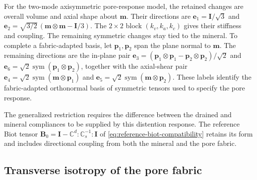 For the two-mode axisymmetric pore-response model, the retained changes are
overall volume and axial shape about \(\mathbf m\). Their directions are
\(\mathbf e_1=\mathbf I/\sqrt3\) and
\(\mathbf e_2=\sqrt{3/2}\,(\mathbf m\otimes\mathbf m-\mathbf I/3)\).
The \(2\times2\) block \((k_v,k_a,k_c)\) gives their stiffness and coupling.
The remaining symmetric changes stay tied to the mineral. To complete a
fabric-adapted basis, let \(\mathbf p_1,\mathbf p_2\) span the plane normal
to \(\mathbf m\). The remaining directions are the in-plane pair
\(\mathbf e_3=(\mathbf p_1\otimes\mathbf p_1-\mathbf p_2\otimes\mathbf p_2)/\sqrt2\)
and \(\mathbf e_6=\sqrt2\operatorname{sym}(\mathbf p_1\otimes\mathbf p_2)\),
together with the axial-shear pair
\(\mathbf e_4=\sqrt2\operatorname{sym}(\mathbf m\otimes\mathbf p_1)\) and
\(\mathbf e_5=\sqrt2\operatorname{sym}(\mathbf m\otimes\mathbf p_2)\).
These labels identify the fabric-adapted orthonormal basis of symmetric
tensors used to specify the pore response.

The generalized restriction requires the difference between the drained and
mineral compliances to be supplied by this distention response. The reference
Biot tensor \(\mathbf B_0=\mathbf I-\mathbb{C}^d:\mathbb{C}_s^{-1}:\mathbf I\)
of \eqref{eq:reference-biot-compatibility} retains its form and includes
directional coupling from both the mineral and the pore fabric.

\subsection{Transverse isotropy of the pore fabric}
\label{sec:fabric-transverse}

